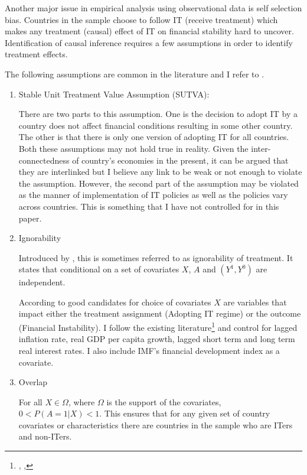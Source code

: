 \documentclass[12pt]{article}
\begin{document}
Another major issue in empirical analysis using observational data is self selection bias.  Countries in the sample choose to follow IT (receive treatment) which makes any treatment (causal) effect of IT on financial stability hard to uncover. Identification of causal inference requires a few assumptions in order to identify treatment effects.

The following assumptions are common in the literature and I refer to \cite[chap.~21]{RN22}.

\begin{enumerate}
\item Stable Unit Treatment Value Assumption (SUTVA):

There are two parts to this assumption. One is the decision to adopt IT by a country does not affect financial conditions resulting in some other country. The other is that there is only one version of adopting IT for all countries. Both these assumptions may not hold true in reality. Given the inter-connectedness of country's economies in the present, it can be argued that they are interlinked but I believe any link to be weak or not enough to violate the assumption. However, the second part of the assumption may be violated as the manner of implementation of IT policies as well as the policies vary across countries. This is something that I have not controlled for in this paper. 

\item Ignorability

Introduced by \cite{RN21}, this is sometimes referred to as ignorability of treatment.  It states that conditional on a set of covariates $X$, $A$ and $(Y^{1},Y^{0})$ are independent.

According to \cite[chap.~21]{RN22} good candidates for choice of covariates $X$ are variables that impact either the treatment assignment (Adopting IT regime) or the outcome (Financial Instability). I follow the existing literature\footnote{\cite{RN4}, \cite{RN13},\cite{RN34}} and control for lagged inflation rate, real GDP per capita growth, lagged short term and long term real interest rates.  I also include IMF's financial development index as a covariate.

\item Overlap

For all $X \in \Omega$, where $\Omega$ is the support of the covariates, $ 0 < P(A=1|X) < 1 $. This ensures that for any given set of country covariates or characteristics there are countries in the sample who are ITers and non-ITers. 
\end{enumerate}
\end{document}
